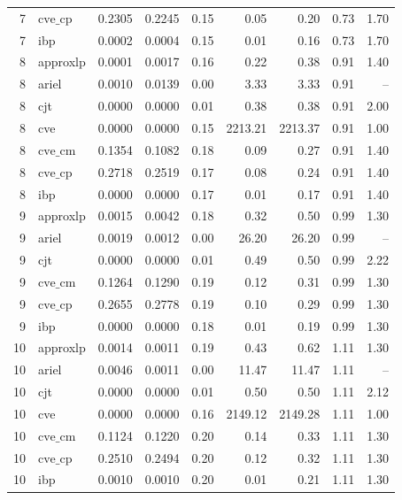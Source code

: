 \documentclass{article}
\begin{document}
\begin{table}[ht]
\begin{tabular}{rlrrrrrrr}
 7 & $\text{cve\_cp}$ & 0.2305 & 0.2245 & 0.15 & 0.05 & 0.20 & 0.73 & 1.70 \\
 7 & ibp & 0.0002 & 0.0004 & 0.15 & 0.01 & 0.16 & 0.73 & 1.70 \\
\hline
 8 & approxlp & 0.0001 & 0.0017 & 0.16 & 0.22 & 0.38 & 0.91 & 1.40 \\
 8 & ariel & 0.0010 & 0.0139 & 0.00 & 3.33 & 3.33 & 0.91 & -- \\
 8 & cjt & 0.0000 & 0.0000 & 0.01 & 0.38 & 0.38 & 0.91 & 2.00 \\
 8 & cve & 0.0000 & 0.0000 & 0.15 & 2213.21 & 2213.37 & 0.91 & 1.00 \\
 8 & $\text{cve\_cm}$ & 0.1354 & 0.1082 & 0.18 & 0.09 & 0.27 & 0.91 & 1.40 \\
 8 & $\text{cve\_cp}$ & 0.2718 & 0.2519 & 0.17 & 0.08 & 0.24 & 0.91 & 1.40 \\
 8 & ibp & 0.0000 & 0.0000 & 0.17 & 0.01 & 0.17 & 0.91 & 1.40 \\
\hline
 9 & approxlp & 0.0015 & 0.0042 & 0.18 & 0.32 & 0.50 & 0.99 & 1.30 \\
 9 & ariel & 0.0019 & 0.0012 & 0.00 & 26.20 & 26.20 & 0.99 & -- \\
 9 & cjt & 0.0000 & 0.0000 & 0.01 & 0.49 & 0.50 & 0.99 & 2.22 \\
 9 & $\text{cve\_cm}$ & 0.1264 & 0.1290 & 0.19 & 0.12 & 0.31 & 0.99 & 1.30 \\
 9 & $\text{cve\_cp}$ & 0.2655 & 0.2778 & 0.19 & 0.10 & 0.29 & 0.99 & 1.30 \\
 9 & ibp & 0.0000 & 0.0000 & 0.18 & 0.01 & 0.19 & 0.99 & 1.30 \\
\hline
 10 & approxlp & 0.0014 & 0.0011 & 0.19 & 0.43 & 0.62 & 1.11 & 1.30 \\
 10 & ariel & 0.0046 & 0.0011 & 0.00 & 11.47 & 11.47 & 1.11 & -- \\
 10 & cjt & 0.0000 & 0.0000 & 0.01 & 0.50 & 0.50 & 1.11 & 2.12 \\
 10 & cve & 0.0000 & 0.0000 & 0.16 & 2149.12 & 2149.28 & 1.11 & 1.00 \\
 10 & $\text{cve\_cm}$ & 0.1124 & 0.1220 & 0.20 & 0.14 & 0.33 & 1.11 & 1.30 \\
 10 & $\text{cve\_cp}$ & 0.2510 & 0.2494 & 0.20 & 0.12 & 0.32 & 1.11 & 1.30 \\
 10 & ibp & 0.0010 & 0.0010 & 0.20 & 0.01 & 0.21 & 1.11 & 1.30 \\
\bottomrule
\end{tabular}
\end{table}
\end{document}
